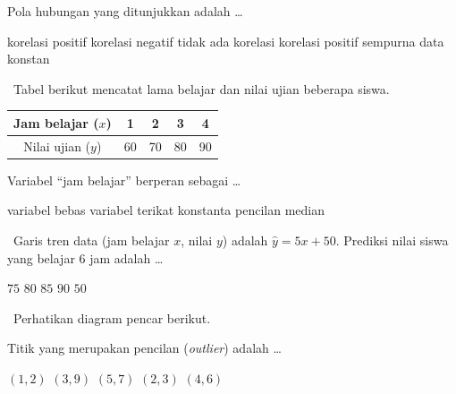 \documentclass[11pt,a4paper]{exam}
\newcommand{\Inter}{{\footnotesize\textsf{\textcolor{biru}{[Intermediate]}}}\ }
\newcommand{\Adv}{{\footnotesize\textsf{\textcolor{oranye}{[Advanced]}}}\ }
\begin{document}
\begin{questions}
Pola hubungan yang ditunjukkan adalah \dots
\begin{choices}
\choice korelasi positif \CorrectChoice korelasi negatif \choice tidak ada korelasi
\choice korelasi positif sempurna \choice data konstan
\end{choices}

\question \Inter Tabel berikut mencatat lama belajar dan nilai ujian beberapa siswa.

\begin{center}\small
\begin{tabular}{|c|c|c|c|c|}
\hline
Jam belajar ($x$) & 1 & 2 & 3 & 4\\\hline
Nilai ujian ($y$) & 60 & 70 & 80 & 90\\\hline
\end{tabular}
\end{center}

Variabel ``jam belajar'' berperan sebagai \dots
\begin{choices}
\CorrectChoice variabel bebas \choice variabel terikat \choice konstanta
\choice pencilan \choice median
\end{choices}

\question \Adv Garis tren data (jam belajar $x$, nilai $y$) adalah $\hat{y} = 5x + 50$.
Prediksi nilai siswa yang belajar 6 jam adalah \dots
\begin{choices}
\choice $75$ \CorrectChoice $80$ \choice $85$ \choice $90$ \choice $50$
\end{choices}

\question \Adv Perhatikan diagram pencar berikut.

\begin{center}
\end{center}

Titik yang merupakan pencilan (\emph{outlier}) adalah \dots
\begin{choices}
\choice $(1,2)$ \CorrectChoice $(3,9)$ \choice $(5,7)$ \choice $(2,3)$ \choice $(4,6)$
\end{choices}


\end{questions}
\end{document}
